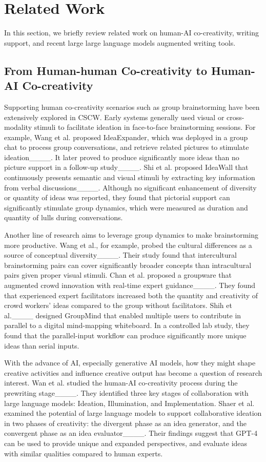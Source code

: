 \section{Related Work}
In this section, we briefly review related work on human-AI co-creativity, writing support, and recent large large language models augmented writing tools.

\subsection{From Human-human Co-creativity to Human-AI Co-creativity}
Supporting human co-creativity scenarios such as group brainstorming have been extensively explored in CSCW. Early systems generally used visual or cross-modality stimuli to facilitate ideation in face-to-face brainstorming sessions. For example, Wang et al. proposed IdeaExpander, which was deployed in a group chat to process group conversations, and retrieve related pictures to stimulate ideation____. It later proved to produce significantly more ideas than no picture support in a follow-up study____. Shi et al. proposed IdeaWall that continuously presents semantic and visual stimuli by extracting key information from verbal discussions____. Although no significant enhancement of diversity or quantity of ideas was reported, they found that pictorial support can significantly stimulate group dynamics, which were measured as duration and quantity of lulls during conversations.

Another line of research aims to leverage group dynamics to make brainstorming more productive. Wang et al., for example, probed the cultural differences as a source of conceptual diversity____. Their study found that intercultural brainstorming pairs can cover significantly broader concepts than intracultural pairs given proper visual stimuli. Chan et al. proposed a groupware that augmented crowd innovation with real-time expert guidance____. They found that experienced expert facilitators increased both the quantity and creativity of crowd workers' ideas compared to the group without facilitators. Shih et al.____ designed GroupMind that enabled multiple users to contribute in parallel to a digital mind-mapping whiteboard. In a controlled lab study, they found that the parallel-input workflow can produce significantly more unique ideas than serial inputs.

With the advance of AI, especially generative AI models, how they might shape creative activities and influence creative output has become a question of research interest. Wan et al. studied the human-AI co-creativity process during the prewriting stage____. They identified three key stages of collaboration with large language models: Ideation, Illumination, and Implementation. Shaer et al. examined the potential of large language models to support collaborative ideation in two phases of creativity: the divergent phase as an idea generator, and the convergent phase as an idea evaluator____. Their findings suggest that GPT-4 can be used to provide unique and expanded perspectives, and evaluate ideas with similar qualities compared to human experts.

